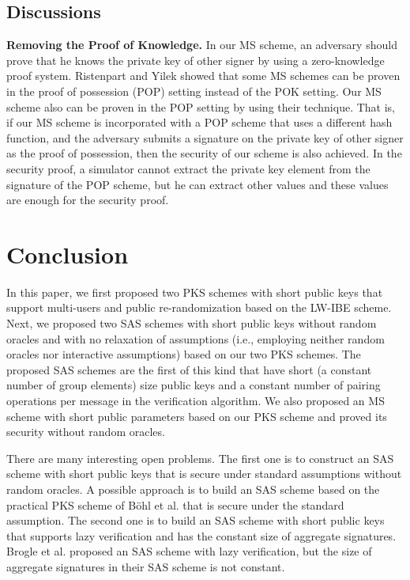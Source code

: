 \documentclass[11pt,letterpaper]{article}
\newcommand{\tb}[1]{\textbf{#1}}
\begin{document}
\subsection{Discussions}

\tb{Removing the Proof of Knowledge.} In our MS scheme, an adversary should
prove that he knows the private key of other signer by using a zero-knowledge
proof system. Ristenpart and Yilek \cite{RistenpartY07} showed that some MS
schemes can be proven in the proof of possession (POP) setting instead of the
POK setting. Our MS scheme also can be proven in the POP setting by using
their technique. That is, if our MS scheme is incorporated with a POP scheme
that uses a different hash function, and the adversary submits a signature on
the private key of other signer as the proof of possession, then the security
of our scheme is also achieved. In the security proof, a simulator cannot
extract the private key element  from the signature of the POP
scheme, but he can extract other values  and these values are enough for the security proof.

\section{Conclusion}

In this paper, we first proposed two PKS schemes with short public keys that
support multi-users and public re-randomization based on the LW-IBE scheme.
Next, we proposed two SAS schemes with short public keys without random
oracles and with no relaxation of assumptions (i.e., employing neither random
oracles nor interactive assumptions) based on our two PKS schemes. The
proposed SAS schemes are the first of this kind that have short (a constant
number of group elements) size public keys and a constant number of pairing
operations per message in the verification algorithm. We also proposed an MS
scheme with short public parameters based on our PKS scheme and proved its
security without random oracles.

There are many interesting open problems. The first one is to construct an
SAS scheme with short public keys that is secure under standard assumptions
without random oracles. A possible approach is to build an SAS scheme based
on the practical PKS scheme of B{\"{o}}hl et al. \cite{BohlHJKSS13} that is
secure under the standard assumption. The second one is to build an SAS
scheme with short public keys that supports lazy verification and has the
constant size of aggregate signatures. Brogle et al. \cite{BrogleGR12}
proposed an SAS scheme with lazy verification, but the size of aggregate
signatures in their SAS scheme is not constant.
\end{document}

